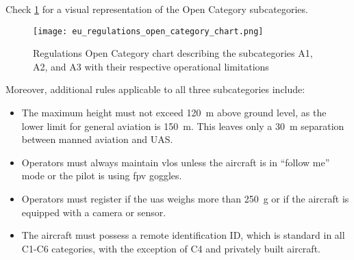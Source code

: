 Check \cref{fig:eu_regulations_open_category_chart} for a visual representation of the Open Category subcategories.

\begin{figure}
  \texttt{[image: eu\_regulations\_open\_category\_chart.png]}
  \caption{ Regulations Open Category chart describing the subcategories A1, A2, and A3 with their respective operational limitations \autocite{ageagleEuropeanUnion}}\label{fig:eu_regulations_open_category_chart}
\end{figure}

Moreover, additional rules applicable to all three subcategories include:

\begin{itemize}
  \item The maximum height must not exceed \SI{120}{\meter} above ground level, as the lower limit for general aviation is \SI{150}{\meter}. This leaves only a \SI{30}{\meter} separation between manned aviation and UAS.\@

  \item Operators must always maintain \gls{vlos} unless the aircraft is in ``follow me'' mode or the pilot is using \gls{fpv} goggles.

  \item Operators must register if the \gls{uas} weighs more than \SI{250}{\gram} or if the aircraft is equipped with a camera or sensor.

  \item The aircraft must possess a remote identification ID, which is standard in all C1-C6 categories, with the exception of C4 and privately built aircraft.
\end{itemize}
